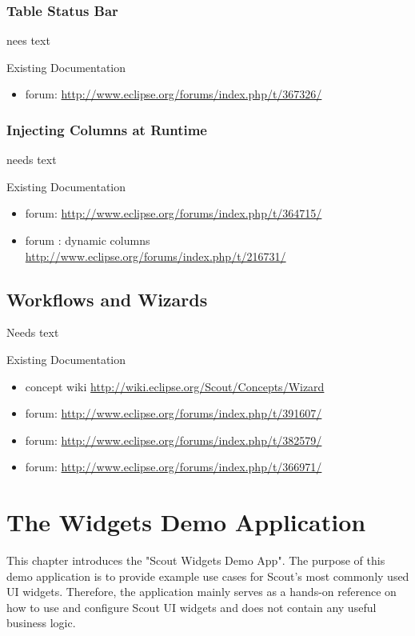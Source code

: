 \documentclass[a4paper,10pt,twoside]{book}
\begin{document}
{\subsection{Table Status Bar}
nees text

\noindent Existing Documentation
\begin{itemize}
  \item forum: \url{http://www.eclipse.org/forums/index.php/t/367326/}
\end{itemize}

\subsection{Injecting Columns at Runtime}
needs text

\noindent Existing Documentation
\begin{itemize}
  \item forum: \url{http://www.eclipse.org/forums/index.php/t/364715/}
  \item forum : dynamic columns \url{http://www.eclipse.org/forums/index.php/t/216731/}
\end{itemize}

\section{Workflows and Wizards}
Needs text

\noindent Existing Documentation
\begin{itemize}
  \item concept wiki \url{http://wiki.eclipse.org/Scout/Concepts/Wizard}
  \item forum: \url{http://www.eclipse.org/forums/index.php/t/391607/}
  \item forum: \url{http://www.eclipse.org/forums/index.php/t/382579/}
  \item forum: \url{http://www.eclipse.org/forums/index.php/t/366971/}
\end{itemize}

\chapter{The Widgets Demo Application}

This chapter introduces the "Scout Widgets Demo App".
The purpose of this demo application is to provide example use cases for Scout's most commonly used UI widgets. 
Therefore, the application mainly serves as a hands-on reference on how to use and configure Scout UI widgets and does not contain any useful business logic.

}
\end{document}
